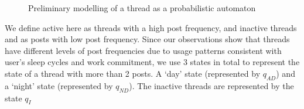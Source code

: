 \documentclass[12 pt]{article}
\begin{document}
\begin{figure}[H]
	\begin{center}

\end{center}
	\caption{Preliminary modelling of a thread as a probabilistic automaton}\label{spaceship}
\end{figure}
We define active here as threads with a high post frequency, and inactive threads and as posts with low post frequency. Since our observations show that threads have different levels of post frequencies due to usage patterns consistent with user's sleep cycles and work commitment, we use 3 states in total to represent the state of a thread with more than 2 posts. A `day' state (represented by $q_{AD}$) and a `night' state (represented by $q_{ND}$). The inactive threads are represented by the state $q_I$
\end{document}
